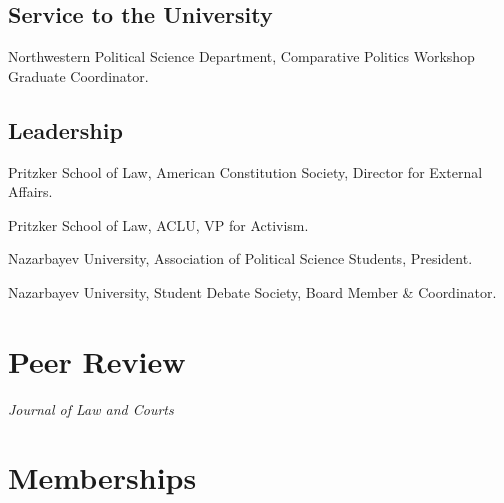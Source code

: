 \documentclass[11pt,letterpaper]{report}
\newcommand{\listitemspace}{0.25em}
\renewenvironment{itemize}
{\begin{list}{}{\setlength{\leftmargin}{0em}
                \setlength{\parskip}{0em}
                \setlength{\itemsep}{\listitemspace}
                \setlength{\parsep}{\listitemspace}}}
{\end{list}}
\begin{document}
   

    \subsection*{Service to the University}

    \begin{tablist}
        \item[2024--25]   \tab{}Northwestern Political Science Department, Comparative Politics Workshop Graduate Coordinator.
        
    \end{tablist}


    \subsection*{Leadership}

    \begin{tablist}
        \item[2023--24] \tab{}Pritzker School of Law, American Constitution Society, Director for External Affairs.
        \item[2023--24] \tab{}Pritzker School of Law, ACLU, VP for Activism.
        \item[2019] \tab{} Nazarbayev University, Association of Political Science Students, President.
        \item[2017--19] \tab{} Nazarbayev University, Student Debate Society, Board Member \& Coordinator.
    \end{tablist}


   



    \section*{Peer Review}


    \begin{itemize}

        \item \textit{Journal of Law and Courts}
      

    \end{itemize}

  



    \section*{Memberships}
\end{document}
